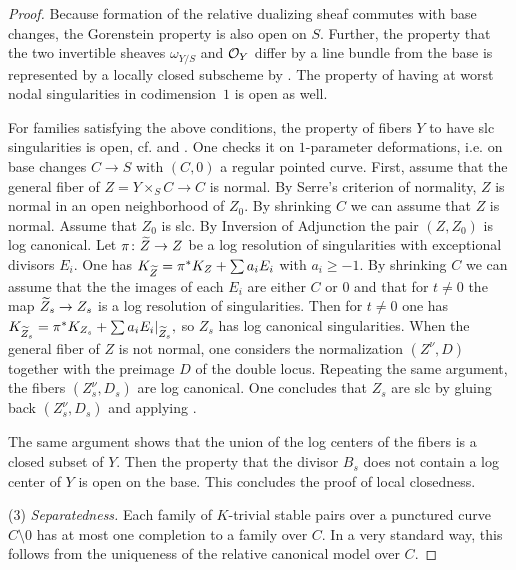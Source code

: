\documentclass[table,x11names]{amsart}
\begin{document}
\begin{proof}
  Because formation of the relative dualizing sheaf commutes with base
  changes, the Gorenstein property is also open on $S$. Further, the
  property that the two invertible sheaves $\omega_{Y/S}$ and ${\mathcal O}_Y$
  differ by a line bundle from the base
  is represented by a locally closed subscheme by 
  \cite[Lem.\ 1.19]{viehweg1995quasi-projective-moduli}.  The property
  of having at worst nodal singularities in codimension~$1$ is open as
  well.

  For families satisfying the above conditions, the property of fibers
  $Y$ to have slc singularities is open, cf.
  \cite[2.6]{karu2000minimal-models} and
  \cite[5.5]{kollar1988threefolds-and-deformations}.  One checks it on
  $1$-parameter deformations, i.e. on base changes $C\to S$ with
  $(C,0)$ a regular pointed curve. First, assume that the general
  fiber of $Z=Y\times_S C\to C$ is normal. By Serre's criterion of
  normality, $Z$ is normal in an open neighborhood of $Z_0$. By
  shrinking $C$ we can assume that $Z$ is normal. Assume that
  $Z_0$ is slc. By Inversion of Adjunction
  \cite{kawakita2007inversion-of-adjunction} the pair $(Z,Z_0)$
  is log canonical. Let $\pi\colon{\widetilde Z}\to Z$ be a log resolution of
  singularities with exceptional divisors $E_i$. One has
  \begin{math}
    K_{{\widetilde Z}} = \pi^* K_{Z} + \sum a_i E_i
  \end{math}
  with $a_i\ge -1$.
  By shrinking $C$ we can assume that the the images of each $E_i$
  are either $C$ or $0$ and that for $t\ne0$ the map
  ${\widetilde Z}_s\to Z_s$ is a log resolution of singularities. Then for
  $t\ne0$ one has
  \begin{math}
    K_{{\widetilde Z}_s} = \pi^* K_{Z_s} + \sum a_i E_i|_{{\widetilde Z}_s},
  \end{math}
  so $Z_s$ has log canonical singularities. When the general fiber
  of $Z$ is not normal, one considers the normalization
  $({Z}^\nu,D)$ together with the preimage $D$ of the double
  locus. Repeating the same argument, the fibers $({Z}^\nu_s,D_s)$
  are log canonical. One concludes that $Z_s$ are slc by gluing back
  $({Z}^\nu_s,D_s)$ and applying
  \cite[5.38]{kollar2013singularities-of-the-minimal}.

  The same argument shows that the union of the log centers of the
  fibers is a closed subset of $Y$. Then the property that the
  divisor $B_s$ does not contain a log center of $Y$ is open on the
  base. This concludes the proof of local closedness.
  
  (3) \emph{Separatedness.} Each family of $K$-trivial stable pairs
  over a punctured curve $C\setminus 0$ has at most one completion to a
  family over $C$. In a very standard way, this follows from the
  uniqueness of the relative canonical model over $C$.


\end{proof}
\end{document}
